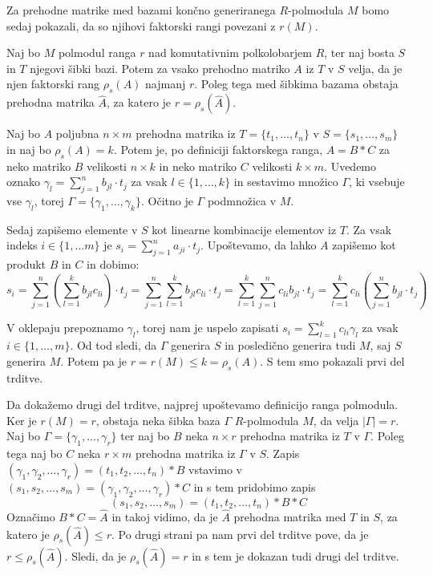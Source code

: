 \documentclass[mat1]{fmfdelo}
\newcommand{\abs}[1]{\ensuremath{\lvert #1 \rvert}}
\begin{document}
Za prehodne matrike med bazami končno generiranega $R$-polmodula $M$ bomo sedaj pokazali, da so njihovi faktorski rangi povezani z $r(M)$.

\begin{izrek}\label{izr:transmatfakrang}
	Naj bo $M$ polmodul ranga $r$ nad komutativnim polkolobarjem $R$, ter naj bosta $S$ in $T$ njegovi šibki bazi. Potem za vsako prehodno matriko $A$ iz $T$ v $S$ velja, da je njen faktorski rang $\rho_s(A)$ najmanj $r$. Poleg tega med šibkima bazama obstaja prehodna matrika $\widehat{A}$, za katero je $r = \rho_s(\widehat{A})$.
\end{izrek}

\begin{dokaz}
		Naj bo $A$ poljubna $n\times m$ prehodna matrika iz $T = \{t_1, \ldots, t_n\}$ v $S = \{s_1, \ldots, s_m\}$ in naj bo $\rho_s(A) = k$. Potem je, po definiciji faktorskega ranga, $A = B*C$ za neko matriko $B$ velikosti $n\times k$ in neko matriko $C$ velikosti $k\times m$. Uvedemo oznako $\gamma_l =\sum_{j = 1}^{n}b_{jl}\cdot t_j$ za vsak $l\in \{1, \ldots, k\}$ in sestavimo množico $\Gamma$, ki vsebuje vse $\gamma_l$, torej $\Gamma = \{\gamma_1, \ldots, \gamma_k\}$. Očitno je $\Gamma$ podmnožica v $M$.
		
		Sedaj zapišemo elemente v $S$ kot linearne kombinacije elementov iz $T$. Za vsak indeks $i\in\{1, \ldots m\}$ je $s_i = \sum_{j = 1}^{n} a_{ji}\cdot t_j$. Upoštevamo, da lahko $A$ zapišemo kot produkt $B$ in $C$ in dobimo:  $$s_i = \sum_{j=1}^{n} \left(\sum_{l = 1}^{k}b_{jl}c_{li}\right)\cdot t_j = \sum_{j=1}^{n}\sum_{l = 1}^{k}b_{jl}c_{li}\cdot t_j = \sum_{l=1}^{k}\sum_{j = 1}^{n}c_{li}b_{jl}\cdot t_j = \sum_{l=1}^{k}c_{li}\left(\sum_{j = 1}^{n}b_{jl}\cdot t_j\right)$$
		
		V oklepaju prepoznamo $\gamma_l$, torej nam je uspelo zapisati $s_i = \sum_{l = 1}^{k} c_{li}\gamma_l$ za vsak $i\in \{1, \ldots, m\}$. Od tod sledi, da $\Gamma$ generira $S$ in posledično generira tudi $M$, saj $S$ generira $M$. Potem pa je $r = r(M) \leq k = \rho_s(A)$. S tem smo pokazali prvi del trditve.
		
		Da dokažemo drugi del trditve, najprej upoštevamo definicijo ranga polmodula. Ker je $r(M) = r$, obstaja neka šibka baza $\Gamma$ $R$-polmodula $M$, da velja $\abs{\Gamma} = r$. Naj bo $\Gamma = \{\gamma_1, \ldots, \gamma_r\}$ ter naj bo $B$ neka $n\times r$ prehodna matrika iz $T$ v $\Gamma$. Poleg tega naj bo $C$ neka $r\times m$ prehodna matrika iz $\Gamma$ v $S$. Zapis $(\gamma_1, \gamma_2, \ldots, \gamma_r) = (t_1, t_2, \ldots, t_n)*B$ vstavimo v $(s_1, s_2, \ldots, s_m) = (\gamma_1, \gamma_2, \ldots, \gamma_r)*C$ in s tem pridobimo zapis $$(s_1, s_2, \ldots, s_m) = (t_1, t_2, \ldots, t_n)*B*C$$ Označimo $B*C = \widehat{A}$ in takoj vidimo, da je $\widehat{A}$ prehodna matrika med $T$ in $S$, za katero je $\rho_s(\widehat{A}) \leq r$. Po drugi strani pa nam prvi del trditve pove, da je $r \leq \rho_s(\widehat{A})$. Sledi, da je $\rho_s(\widehat{A}) = r$ in s tem je dokazan tudi drugi del trditve.
\end{dokaz}
\end{document}
